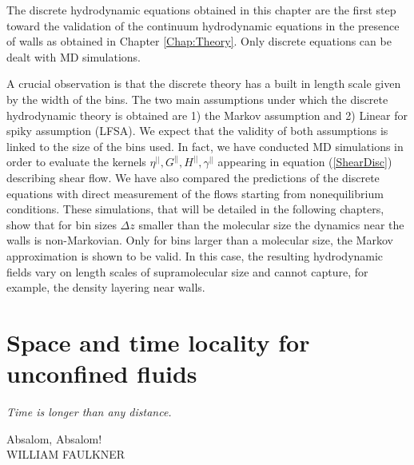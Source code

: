 \documentclass[b5paper,openright,10pt]{book}
\begin{document}
The discrete hydrodynamic equations obtained  in this chapter are
the first  step toward the  validation of the  continuum hydrodynamic
equations    in   the    presence    of   walls    as   obtained    in Chapter \ref{Chap:Theory}. Only discrete equations  can be dealt with MD
simulations. 

A  crucial observation  is that  the discrete  theory has  a built  in
length scale given by the width of the bins.  The two main assumptions
under which  the discrete hydrodynamic  theory is obtained are  1) the
Markov  assumption and  2)  Linear for  spiky  assumption (LFSA).   We
expect that the validity of both  assumptions is linked to the size of
the bins used.  In fact, we  have conducted MD simulations in order to
evaluate  the kernels  $\eta^{||},G^{||},H^{||},\gamma^{||}$ appearing
in equation (\ref{ShearDisc})  describing shear flow. We  have also compared
the predictions of  the discrete equations with  direct measurement of
the   flows   starting   from   nonequilibrium   conditions.    These
simulations, that will  be detailed in the following chapters, show that
for bin sizes $\Delta z$ smaller  than the molecular size the dynamics
near the walls is non-Markovian. Only for bins larger than a molecular
size,  the  Markov   approximation  is  shown  to   be  valid. 
In this case, the resulting  hydrodynamic fields vary on length  scales of supramolecular size and  cannot capture, for example, the density layering near walls.




\chapter{Space and time locality for unconfined fluids}\label{Chap:PBC}
\epigraph{\textit{Time is longer than any distance.}}{Absalom, Absalom! \\ WILLIAM FAULKNER}
\end{document}
